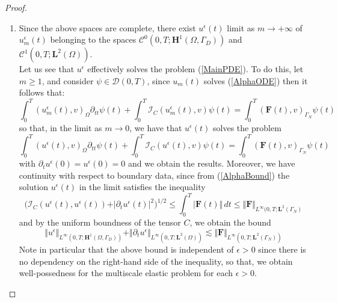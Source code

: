 \begin{proof}
\begin{enumerate}
    
    \item Since the above spaces are complete, there exist $u^{\epsilon}(t)$ limit as $m \longrightarrow +\infty$ of $u^{\epsilon}_m(t)$ belonging to the spaces $\mathcal{C}^0(0,T; \mathbf{H}^1(\Omega, \Gamma_D))$ and $\mathcal{C}^1(0,T; \mathbf{L}^2(\Omega))$.\\
    Let us see that $u^{\epsilon}$ effectively solves the problem (\ref{MainPDE}). To do this, let $m \geq 1$, and consider $\psi \in \mathcal{D}(0,T)$, since $u_m(t)$ solves (\ref{AlphaODE}) then it follows that:
    \begin{equation*}
        \int_0^T (u_m^{\epsilon}(t),v)_{\Omega} \partial_{tt}\psi(t) + \int_0^T \mathcal{I}_C (u_m^{\epsilon}(t),v) \psi(t)  = \int_0^T (\mathbf{F}(t),v)_{\Gamma_N} \psi(t) 
    \end{equation*}
    so that, in the limit as $m \longrightarrow 0$, we have that $u^{\epsilon}(t)$ solves the problem
    \begin{equation*}
        \int_0^T (u^{\epsilon}(t),v)_{\Omega} \partial_{tt}\psi(t) + \int_0^T \mathcal{I}_C (u^{\epsilon}(t),v) \psi(t) = \int_0^T (\mathbf{F}(t),v)_{\Gamma_N}\psi(t) 
    \end{equation*}
    with $\partial_t u^{\epsilon}(0) = u^{\epsilon}(0) = 0$ and we obtain the results. Moreover, we have continuity with respect to boundary data, since from (\ref{AlphaBound}) the solution $u^{\epsilon}(t)$ in the limit satisfies the inequality 
    \begin{equation*}
        \big( \mathcal{I}_C(u^{\epsilon}(t), u^{\epsilon}(t))+ \vert \partial_t u^{\epsilon}(t) \vert^2 \big)^{1/2} \leq \int_0^T \vert \mathbf{F}(t) \Vert \, dt \leq \Vert \mathbf{F}\Vert_{L^{\infty}(0,T;\mathbf{L}^2(\Gamma_N)}
    \end{equation*}
    and by the uniform boundness of the tensor $C$, we obtain the bound
    \begin{equation*}
        \Vert u^{\epsilon} \Vert_{L^{\infty}(0,T;\mathbf{H}^1(\Omega, \Gamma_D))}  + \Vert \partial_t u^{\epsilon} \Vert_{L^{\infty}(0,T;\mathbf{L}^2(\Omega))} \lesssim \Vert \mathbf{F}\Vert_{L^{\infty}(0,T; \mathbf{L}^2(\Gamma_N))}
    \end{equation*}
    Note in particular that the above bound is independent of $\epsilon > 0$ since there is no dependency on the right-hand side of the inequality, so that, we obtain well-possedness for the multiscale elastic problem for each $\epsilon > 0$.
\end{enumerate}

\end{proof}

